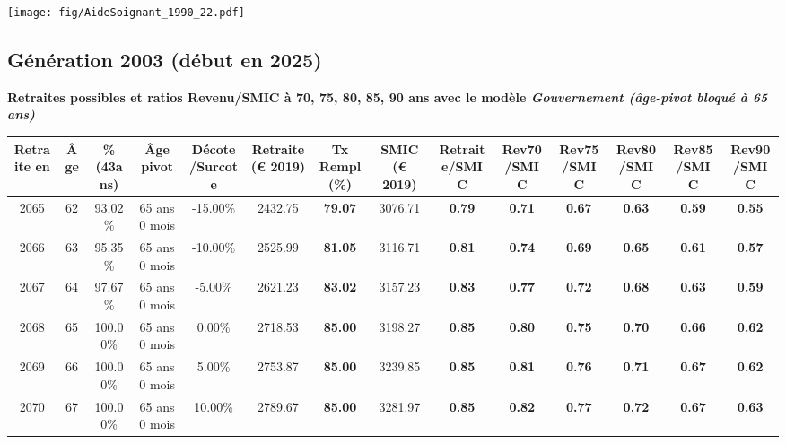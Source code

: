 \vspace{0.1cm} 

 \begin{center}\texttt{[image: fig/AideSoignant\_1990\_22.pdf]}\end{center} \label{fig/AideSoignant_1990_22.pdf} 

\newpage 
 
\subsection{Génération 2003 (début en 2025)} 

{\bf \noindent Retraites possibles et ratios Revenu/SMIC à 70, 75, 80, 85, 90 ans avec le modèle \emph{Gouvernement (âge-pivot bloqué à 65 ans)}}  
 
\begin{adjustbox}{max width=\textwidth} 
\begin{tabular}[htb]{|c|c||c|c|c||c|c||c||c|c|c|c|c|c|} 
\hline 
 Retraite en &  Âge &  \%(43ans) &  Âge pivot &  Décote/Surcote &  Retraite (\euro{} 2019) &  Tx Rempl(\%) &  SMIC (\euro{} 2019) &  Retraite/SMIC &  Rev70/SMIC &  Rev75/SMIC &  Rev80/SMIC &  Rev85/SMIC &  Rev90/SMIC \\ 
\hline \hline 
 2065 &  62 &  93.02\% &  65 ans 0 mois &  -15.00\% &  2432.75 &  {\bf 79.07} &  3076.71 &  {\bf {\color{red} 0.79}} &  {\bf {\color{red} 0.71}} &  {\bf {\color{red} 0.67}} &  {\bf {\color{red} 0.63}} &  {\bf {\color{red} 0.59}} &  {\bf {\color{red} 0.55}} \\ 
\hline 
 2066 &  63 &  95.35\% &  65 ans 0 mois &  -10.00\% &  2525.99 &  {\bf 81.05} &  3116.71 &  {\bf {\color{red} 0.81}} &  {\bf {\color{red} 0.74}} &  {\bf {\color{red} 0.69}} &  {\bf {\color{red} 0.65}} &  {\bf {\color{red} 0.61}} &  {\bf {\color{red} 0.57}} \\ 
\hline 
 2067 &  64 &  97.67\% &  65 ans 0 mois &  -5.00\% &  2621.23 &  {\bf 83.02} &  3157.23 &  {\bf {\color{red} 0.83}} &  {\bf {\color{red} 0.77}} &  {\bf {\color{red} 0.72}} &  {\bf {\color{red} 0.68}} &  {\bf {\color{red} 0.63}} &  {\bf {\color{red} 0.59}} \\ 
\hline 
 2068 &  65 &  100.00\% &  65 ans 0 mois &  0.00\% &  2718.53 &  {\bf 85.00} &  3198.27 &  {\bf {\color{red} 0.85}} &  {\bf {\color{red} 0.80}} &  {\bf {\color{red} 0.75}} &  {\bf {\color{red} 0.70}} &  {\bf {\color{red} 0.66}} &  {\bf {\color{red} 0.62}} \\ 
\hline 
 2069 &  66 &  100.00\% &  65 ans 0 mois &  5.00\% &  2753.87 &  {\bf 85.00} &  3239.85 &  {\bf {\color{red} 0.85}} &  {\bf {\color{red} 0.81}} &  {\bf {\color{red} 0.76}} &  {\bf {\color{red} 0.71}} &  {\bf {\color{red} 0.67}} &  {\bf {\color{red} 0.62}} \\ 
\hline 
 2070 &  67 &  100.00\% &  65 ans 0 mois &  10.00\% &  2789.67 &  {\bf 85.00} &  3281.97 &  {\bf {\color{red} 0.85}} &  {\bf {\color{red} 0.82}} &  {\bf {\color{red} 0.77}} &  {\bf {\color{red} 0.72}} &  {\bf {\color{red} 0.67}} &  {\bf {\color{red} 0.63}} \\ 
\hline 
\hline 
\end{tabular} 
\end{adjustbox} 
 
